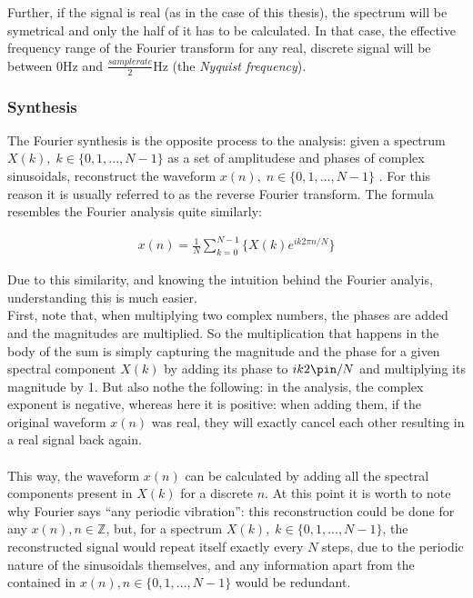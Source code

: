 Further, if the signal is real (as in the case of this thesis), the spectrum will be symetrical and only the half of it has to be calculated. In that case, the effective frequency range of the Fourier transform for any real, discrete signal will be between \(0\)Hz and \(\frac{samplerate}{2}\)Hz (the {\it Nyquist frequency}).

\subsubsection{Synthesis}

The Fourier synthesis is the opposite process to the analysis: given a spectrum \(X(k),\; k \in \{0, 1,..., N-1\}\) as a set of amplitudese and phases of complex sinusoidals, reconstruct the waveform \(x(n),\; n \in \{0, 1,..., N-1\}\) . For this reason it is usually referred to as the reverse Fourier transform. The formula resembles the Fourier analysis quite similarly:

\begin{equation*}
  \begin{aligned}
    x(n) = \frac{1}{N} \sum_{k=0}^{N-1} \big\{ X(k)e^{ik2\pi n / N} \big\}

  \end{aligned}
\end{equation*}


Due to this similarity, and knowing the intuition behind the Fourier analyis, understanding this is much easier.\\

First, note that, when multiplying two complex numbers, the phases are added and the magnitudes are multiplied. So the multiplication that happens in the body of the sum is simply capturing the magnitude and the phase for a given spectral component \(X(k)\) by adding its phase to \(ik2\pin/N\) and multiplying its magnitude by 1. But also nothe the following: in the analysis, the complex exponent is negative, whereas here it is positive: when adding them, if the original waveform  \(x(n)\) was real, they will exactly cancel each other resulting in a real signal back again.\\
\\

This way, the waveform \(x(n)\) can be calculated by adding all the spectral components present in \(X(k)\) for a discrete \(n\). At this point it is worth to note why Fourier says ``any periodic vibration'': this reconstruction could be done for any \(x(n), n\in\mathbb{Z}\), but, for a spectrum  \(X(k),\; k \in \{0, 1,..., N-1\}\), the reconstructed signal would repeat itself exactly every \(N\) steps, due to the periodic nature of the sinusoidals themselves, and any information apart from the contained in  \(x(n), n \in \{0, 1,..., N-1\}\) would be redundant.


